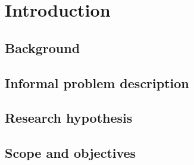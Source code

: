 %
%


\chapter{Introduction}
\vspace{-2em}
\minitoc

\startarabicpagenumbering %


\blindtext

\section{Background}

\blindtext

\blindtext

\section{Informal problem description}

\blindtext

\blindtext

\section{Research hypothesis}

\Blindtext

\section{Scope and objectives}


